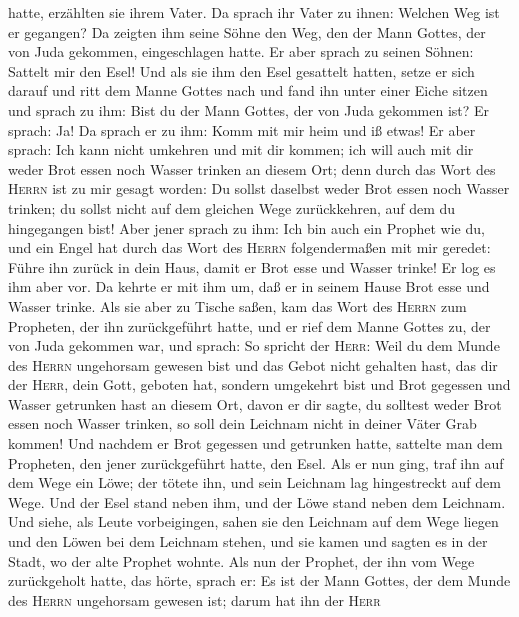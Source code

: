 hatte, erzählten sie ihrem Vater.  Da sprach ihr Vater zu
ihnen: Welchen Weg ist er gegangen? Da zeigten ihm seine Söhne den Weg,
den der Mann Gottes, der von Juda gekommen, eingeschlagen hatte.
 Er aber sprach zu seinen Söhnen: Sattelt mir den Esel!
Und als sie ihm den Esel gesattelt hatten,  setze er sich
darauf und ritt dem Manne Gottes nach und fand ihn unter einer Eiche
sitzen und sprach zu ihm: Bist du der Mann Gottes, der von Juda gekommen
ist? Er sprach: Ja!  Da sprach er zu ihm: Komm mit mir
heim und iß etwas!  Er aber sprach: Ich kann nicht
umkehren und mit dir kommen; ich will auch mit dir weder Brot essen noch
Wasser trinken an diesem Ort;  denn durch das Wort des
\textsc{Herrn} ist zu mir gesagt worden: Du sollst daselbst weder Brot
essen noch Wasser trinken; du sollst nicht auf dem gleichen Wege
zurückkehren, auf dem du hingegangen bist!  Aber jener
sprach zu ihm: Ich bin auch ein Prophet wie du, und ein Engel hat durch
das Wort des \textsc{Herrn} folgendermaßen mit mir geredet: Führe ihn
zurück in dein Haus, damit er Brot esse und Wasser trinke!
 Er log es ihm aber vor. Da kehrte er mit ihm um, daß er
in seinem Hause Brot esse und Wasser trinke.  Als sie
aber zu Tische saßen, kam das Wort des \textsc{Herrn} zum Propheten, der
ihn zurückgeführt hatte,  und er rief dem Manne Gottes
zu, der von Juda gekommen war, und sprach: So spricht der \textsc{Herr}:
Weil du dem Munde des \textsc{Herrn} ungehorsam gewesen bist und das
Gebot nicht gehalten hast, das dir der \textsc{Herr}, dein Gott, geboten
hat,  sondern umgekehrt bist und Brot gegessen und Wasser
getrunken hast an diesem Ort, davon er dir sagte, du solltest weder Brot
essen noch Wasser trinken, so soll dein Leichnam nicht in deiner Väter
Grab kommen!  Und nachdem er Brot gegessen und getrunken
hatte, sattelte man dem Propheten, den jener zurückgeführt hatte, den
Esel.  Als er nun ging, traf ihn auf dem Wege ein Löwe;
der tötete ihn, und sein Leichnam lag hingestreckt auf dem Wege. Und der
Esel stand neben ihm, und der Löwe stand neben dem Leichnam.
 Und siehe, als Leute vorbeigingen, sahen sie den
Leichnam auf dem Wege liegen und den Löwen bei dem Leichnam stehen, und
sie kamen und sagten es in der Stadt, wo der alte Prophet wohnte.
 Als nun der Prophet, der ihn vom Wege zurückgeholt
hatte, das hörte, sprach er: Es ist der Mann Gottes, der dem Munde des
\textsc{Herrn} ungehorsam gewesen ist; darum hat ihn der \textsc{Herr}
